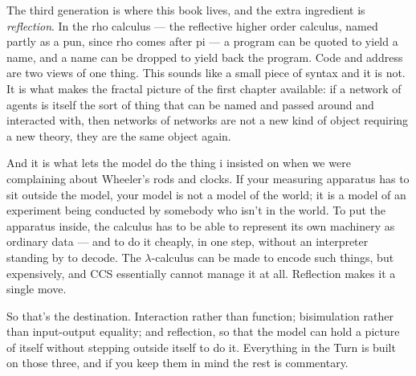 The third generation is where this book lives, and the extra ingredient is \emph{reflection}. In the rho calculus --- the reflective higher order calculus, named partly as a pun, since rho comes after pi --- a program can be quoted to yield a name, and a name can be dropped to yield back the program. Code and address are two views of one thing. This sounds like a small piece of syntax and it is not. It is what makes the fractal picture of the first chapter available: if a network of agents is itself the sort of thing that can be named and passed around and interacted with, then networks of networks are not a new kind of object requiring a new theory, they are the same object again.

And it is what lets the model do the thing i insisted on when we were complaining about Wheeler's rods and clocks. If your measuring apparatus has to sit outside the model, your model is not a model of the world; it is a model of an experiment being conducted by somebody who isn't in the world. To put the apparatus inside, the calculus has to be able to represent its own machinery as ordinary data --- and to do it cheaply, in one step, without an interpreter standing by to decode. The $\lambda$-calculus can be made to encode such things, but expensively, and CCS essentially cannot manage it at all. Reflection makes it a single move.

So that's the destination. Interaction rather than function; bisimulation rather than input-output equality; and reflection, so that the model can hold a picture of itself without stepping outside itself to do it. Everything in the Turn is built on those three, and if you keep them in mind the rest is commentary.

